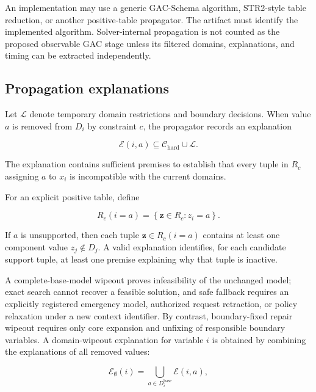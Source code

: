 \documentclass[pdflatex,sn-mathphys-num,iicol,oneside]{sn-jnl}
\begin{document}
An implementation may use a generic GAC-Schema algorithm,
STR2-style table reduction, or another positive-table propagator.
The artifact must identify the implemented algorithm. Solver-internal
propagation is not counted as the proposed observable GAC stage unless
its filtered domains, explanations, and timing can be extracted
independently.

\subsection{Propagation explanations}

Let $\mathcal{L}$ denote temporary domain restrictions and boundary
decisions. When value $a$ is removed from $D_i$ by constraint $c$, the
propagator records an explanation

\begin{equation}
\mathcal{E}(i,a)
\subseteq
\mathcal{C}_{\mathrm{hard}}
\cup
\mathcal{L}.
\label{eq:value-explanation}
\end{equation}

The explanation contains sufficient premises to establish that every
tuple in $R_c$ assigning $a$ to $x_i$ is incompatible with the current
domains.

For an explicit positive table, define

\begin{equation}
R_c(i=a)
=
\left\{
\bm{z}\in R_c:z_i=a
\right\}.
\end{equation}

If $a$ is unsupported, then each tuple
$\bm{z}\in R_c(i=a)$ contains at least one component value
$z_j\notin D_j$. A valid explanation identifies, for each candidate
support tuple, at least one premise explaining why that tuple is
inactive.

A complete-base-model wipeout proves infeasibility of the unchanged model; exact search cannot recover a feasible solution, and safe fallback requires an explicitly registered emergency model, authorized request retraction, or policy relaxation under a new context identifier. By contrast, boundary-fixed repair wipeout requires only core expansion and unfixing of responsible boundary variables. A domain-wipeout explanation for variable $i$ is obtained by combining
the explanations of all removed values:

\begin{equation}
\mathcal{E}_{\emptyset}(i)
=
\bigcup_{a\in D_i^{\mathrm{base}}}
\mathcal{E}(i,a),
\label{eq:wipeout-explanation}
\end{equation}
\end{document}
